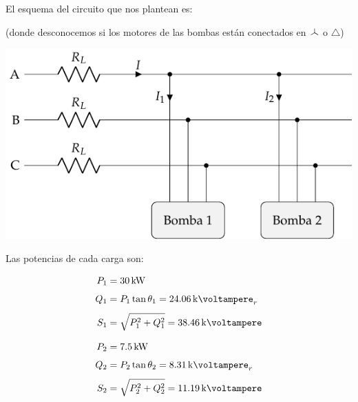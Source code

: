 \begin{minipage}{0.32\linewidth}         
    
    \vspace{-5mm}

    El esquema del circuito que nos plantean es:

    \vspace{8mm}
    (donde desconocemos si los motores de las bombas están conectados en $\wye$ o $\triangle$)    
\end{minipage}
\hfill%
\begin{minipage}{0.6\linewidth}  

    \vspace{-3mm}
    \begin{center}
        \includegraphics[width=1\textwidth]{figuras/BT3_ej5_bombas.pdf}
    \end{center}   
\end{minipage}

\vspace{4mm}
 Las potencias de cada carga son:

\vspace{-2mm}
\begin{minipage}{0.5\linewidth}         
    \begin{align*}
        P_1 &= \SI{30}{\kilo\watt}\\[4pt]
        Q_1 &= P_1\tan \theta_1 = \SI{24.06}{\kilo\voltampere}_r\\[4pt]
        S_1 &= \sqrt{P_1^2 + Q_1^2} = \SI{38.46}{\kilo\voltampere}
    \end{align*}   
\end{minipage}
\hfill%
\begin{minipage}{0.5\linewidth}  
    \begin{align*}
        P_2 &= \SI{7.5}{\kilo\watt}\\[4pt]
        Q_2 &= P_2 \tan \theta_2 = \SI{8.31}{\kilo\voltampere}_r\\[4pt]
        S_2 &= \sqrt{P_2^2 + Q_2^2} = \SI{11.19}{\kilo\voltampere}
    \end{align*} 
\end{minipage}

